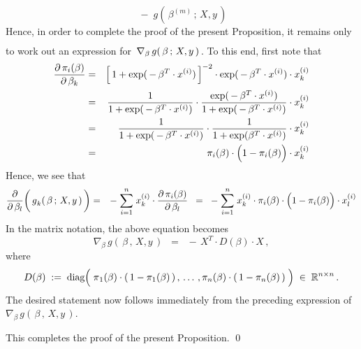 \begin{enumerate}
\begin{equation*}
		\; - \;
		g(\,\beta^{(m)}\,;\,X,y\,)
	\end{equation*}
	Hence, in order to complete the proof of the present Proposition,
	it remains only to work out an expression for
	\,$\overset{{\color{white}\vert}}{\nabla}_{\beta}\,g(\,\beta\,;\,X,y\,)$\,.
	To this end, first note that
	\begin{eqnarray*}
	\dfrac{\partial\,\pi_{i}(\beta)}{\partial\,\beta_{k}}
	&=&
		\left[\,1+\exp(\,-\,\beta^{T}\cdot x^{(i)})\,\right]^{-2}
		\cdot
		\exp(\,-\,\beta^{T}\cdot x^{(i)})
		\cdot
		x^{(i)}_{k}
	\\
	&=&
		\dfrac{1}{1+\exp(\,-\,\beta^{T}\cdot x^{(i)})}
		\cdot
		\dfrac{\exp(\,-\,\beta^{T}\cdot x^{(i)})}{1+\exp(\,-\,\beta^{T}\cdot x^{(i)})}
		\cdot
		x^{(i)}_{k}
	\\
	&=&
		\dfrac{1}{1+\exp(\,-\,\beta^{T}\cdot x^{(i)})}
		\cdot
		\dfrac{1}{1+\exp(\beta^{T}\cdot x^{(i)})}
		\cdot
		x^{(i)}_{k}
	\\
	&=&
		\pi_{i}(\beta)
		\cdot
		\left(1\overset{{\color{white}.}}{-}\pi_{i}(\beta)\right)
		\cdot
		x^{(i)}_{k}
	\end{eqnarray*}
	Hence, we see that
	\begin{eqnarray*}
	\dfrac{\partial}{\partial\,\beta_{l}}\!\left(\,\overset{{\color{white}\vert}}{g}_{k}(\,\beta\,;\,X,y\,)\,\right)
	& = &
		-\;\overset{n}{\underset{i=1}{\sum}}\;x^{(i)}_{k}\cdot\dfrac{\partial\,\pi_{i}(\beta)}{\partial\,\beta_{l}}
	\;\; = \;\;
		-\;\overset{n}{\underset{i=1}{\sum}}\;x^{(i)}_{k}\cdot
		\pi_{i}(\beta)
		\cdot
		\left(1\overset{{\color{white}.}}{-}\pi_{i}(\beta)\right)
		\cdot
		x^{(i)}_{l}
	\end{eqnarray*}
	In the matrix notation, the above equation becomes
	\begin{equation*}
	\nabla_{\beta}\,g(\,\beta\,,\,X,y\,)
	\;\; = \;\;
		-\,X^{T} \cdot D(\beta) \cdot X\,,
	\end{equation*}
	where
	\begin{equation*}
	D(\beta) \; := \; \diag\!\left(\;
		\overset{{\color{white}-}}{\pi}_{1}(\beta) \cdot (\,1-\pi_{1}(\beta)\,)\,,
		\,\ldots\,,
		\pi_{n}(\beta) \cdot (\,1-\pi_{n}(\beta)\,)
		\;\right)
		\;\in\;
		\Re^{n \times n}\,.
	\end{equation*}
	The desired statement now follows immediately from the preceding expression of
	$\nabla_{\beta}\,g(\,\beta\,,\,X,y\,)$.
\end{enumerate}
This completes the proof of the present Proposition.
\qed


\renewcommand{\theenumi}{\roman{enumi}}
\renewcommand{\labelenumi}{\textnormal{(\theenumi)}$\;\;$}

